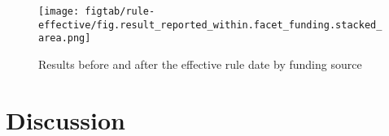 \documentclass[10pt]{article}
\begin{document}
\begin{figure}
	\texttt{[image: figtab/rule-effective/fig.result\_reported\_within.facet\_funding.stacked\_area.png]}
	\label{fig:results-reported-rule-effective-funding}
	\caption{Results before and after the effective rule date by funding source}
\end{figure}


\section{Discussion}

\printbibliography


%
\end{document}
